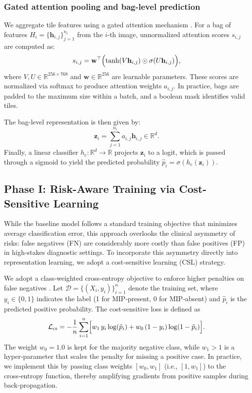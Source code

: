 \documentclass[journal,twoside,web]{ieeecolor}
\begin{document}
\subsubsection{Gated attention pooling and bag-level prediction}\label{S3-1-3}
We aggregate tile features using a gated attention mechanism \cite{ilse2018attention}. For a bag of features \( H_i = \{\mathbf{h}_{i,j}\}_{j=1}^{n_i} \) from the \( i \)-th image, unnormalized attention scores \( s_{i,j} \) are computed as:
\begin{equation*}
    s_{i,j} = \mathbf{w}^\top \Bigl(\tanh(V\mathbf{h}_{i,j}) \odot \sigma(U\mathbf{h}_{i,j})\Bigr),
\end{equation*}
where \( V, U \in \mathbb{R}^{256 \times 768} \) and \( \mathbf{w} \in \mathbb{R}^{256} \) are learnable parameters. These scores are normalized via softmax to produce attention weights \( a_{i,j} \). In practice, bags are padded to the maximum size within a batch, and a boolean mask identifies valid tiles.

The bag-level representation is then given by:
\begin{equation*}
    \mathbf{z}_i = \sum_{j=1}^{n_i} a_{i,j} \mathbf{h}_{i,j} \in \mathbb{R}^{d}.
\end{equation*}
Finally, a linear classifier \( h_{\mathrm{c}}: \mathbb{R}^{d} \to \mathbb{R} \) projects \( \mathbf{z}_i \) to a logit, which is passed through a sigmoid to yield the predicted probability \(\hat{p}_i = \sigma(h_{\mathrm{c}}(\mathbf{z}_i))\).

\subsection{Phase I: Risk-Aware Training via Cost-Sensitive Learning}\label{sec:phase1_method}

While the baseline model follows a standard training objective that minimizes average classification error, this approach overlooks the clinical asymmetry of risks: false negatives (FN) are considerably more costly than false positives (FP) in high‑stakes diagnostic settings. To incorporate this asymmetry directly into representation learning, we adopt a cost‑sensitive learning (CSL) strategy.

We adopt a class‑weighted cross‑entropy objective to enforce higher penalties on false negatives \cite{he2009learning}.  
Let \(\mathcal{D} = \{(X_i, y_i)\}_{i=1}^{n}\) denote the training set, where \(y_i \in \{0,1\}\) indicates the label (1 for MIP‑present, 0 for MIP‑absent) and \(\hat{p}_i\) is the predicted positive probability. The cost‑sensitive loss is defined as  
\begin{equation*}
    \mathcal{L}_{\mathrm{cs}} = - \frac{1}{n} \sum_{i=1}^{n} \Bigl[ w_{1} \, y_i \log(\hat{p}_i) + w_{0} \, (1-y_i) \log(1-\hat{p}_i) \Bigr].
\end{equation*}
The weight \(w_{0}=1.0\) is kept for the majority negative class, while \(w_{1} > 1\) is a hyper‑parameter that scales the penalty for missing a positive case.  
In practice, we implement this by passing class weights \([w_{0}, w_{1}]\) (i.e., \([1, w_{1}]\)) to the cross‑entropy function, thereby amplifying gradients from positive samples during back‑propagation.
\end{document}
